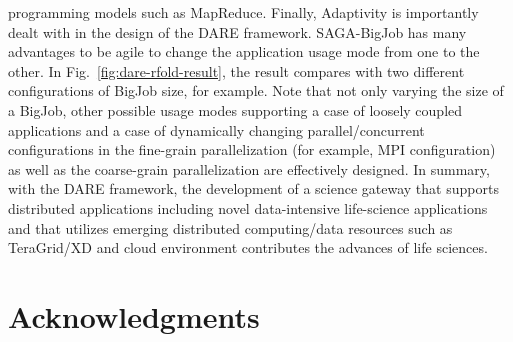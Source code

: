 \documentclass{sig-alternate}
\begin{document}
programming models such as MapReduce.  Finally, Adaptivity is
importantly dealt with in the design of the DARE framework.
SAGA-BigJob has many advantages to be agile to change the application
usage mode from one to the other.  In
Fig.~\ref{fig:dare-rfold-result}, the result compares with two
different configurations of BigJob size, for example.  Note that not
only varying the size of a BigJob, other possible usage modes
supporting a case of loosely coupled applications and a case of
dynamically changing parallel/concurrent configurations in the
fine-grain parallelization (for example, MPI configuration) as well as
the coarse-grain parallelization are effectively designed.
In summary, with the DARE framework, the development of a science gateway that supports distributed applications including novel data-intensive life-science applications and that utilizes emerging distributed computing/data resources such as TeraGrid/XD and cloud environment contributes the advances of life sciences.    


\section{Acknowledgments}






\end{document}
